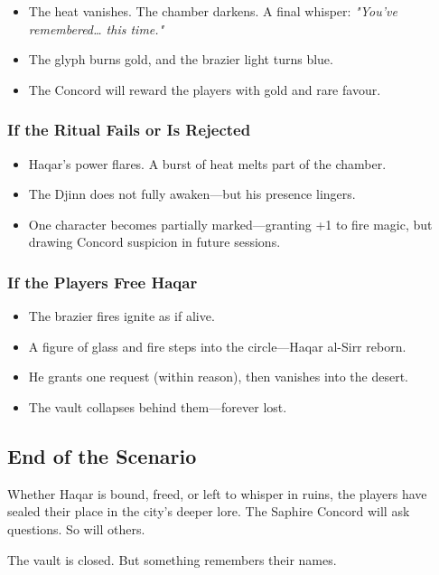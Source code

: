 \begin{itemize}
    \item The heat vanishes. The chamber darkens. A final whisper: \textit{"You’ve remembered… this time."}
    \item The glyph burns gold, and the brazier light turns blue.
    \item The Concord will reward the players with gold and rare favour.
\end{itemize}

\subsubsection*{If the Ritual Fails or Is Rejected}

\begin{itemize}
    \item Haqar’s power flares. A burst of heat melts part of the chamber.
    \item The Djinn does not fully awaken—but his presence lingers.
    \item One character becomes partially marked—granting +1 to fire magic, but drawing Concord suspicion in future sessions.
\end{itemize}

\subsubsection*{If the Players Free Haqar}

\begin{itemize}
    \item The brazier fires ignite as if alive.
    \item A figure of glass and fire steps into the circle—Haqar al-Sirr reborn.
    \item He grants one request (within reason), then vanishes into the desert.
    \item The vault collapses behind them—forever lost.
\end{itemize}

\subsection*{End of the Scenario}

Whether Haqar is bound, freed, or left to whisper in ruins, the players have sealed their place in the city’s deeper lore. The Saphire Concord will ask questions. So will others.

The vault is closed. But something remembers their names.

